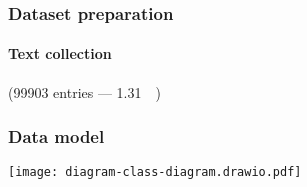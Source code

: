\documentclass[table]{beamer}
\begin{document}
\begin{frame}
\frametitle{Dataset preparation}
\framesubtitle{Text collection}

\centering


\vspace{5mm}

\begin{center}
(\SI{99903}{} entries --- \SI{1.31}{\giga\byte})
\end{center}

\end{frame}

\begin{frame}
\frametitle{Data model}

\centering

\texttt{[image: diagram-class-diagram.drawio.pdf]}

\end{frame}
\end{document}
